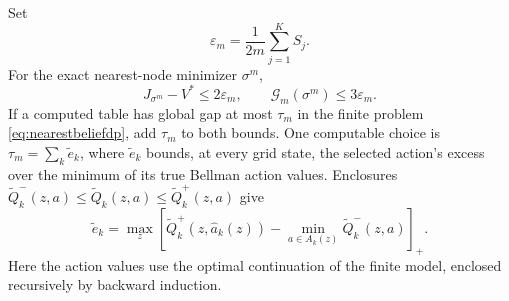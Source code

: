 \begin{proposition}
\label{prop:partialmeshrate}
Set
\[
 \varepsilon_m=\frac1{2m}\sum_{j=1}^K S_j.
\]
For the exact nearest-node minimizer $\sigma^m$,
\begin{equation}\label{eq:partialmeshrate}
 J_{\sigma^m}-V^*\le2\varepsilon_m,\qquad
 \mathcal G_m(\sigma^m)\le3\varepsilon_m.
\end{equation}
If a computed table has global gap at most $\tau_m$ in the finite problem
\eqref{eq:nearestbeliefdp}, add $\tau_m$ to both bounds. One computable
choice is $\tau_m=\sum_k\tilde e_k$, where $\tilde e_k$ bounds, at every grid state,
the selected action's excess over the minimum of its true Bellman action
values. Enclosures
$\widetilde Q_k^-(z,a)\le\widetilde Q_k(z,a)\le\widetilde Q_k^+(z,a)$ give
\begin{equation}\label{eq:partialnumericalgap}
 \tilde e_k=\max_z\left[\widetilde Q_k^+(z,\widehat a_k(z))-
                         \min_{a\in A_k(z)}\widetilde Q_k^-(z,a)\right]_+.
\end{equation}
Here the action values use the optimal continuation of the finite model,
enclosed recursively by backward induction.
\end{proposition}
